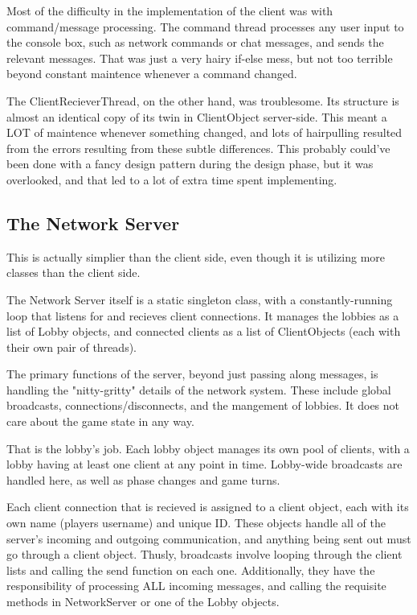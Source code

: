 \documentclass[12pt,a4paper]{article}
\begin{document}
Most of the difficulty in the implementation of the client was with command/message processing. The command thread processes any user input to the console box, such as network commands or chat messages, and sends the relevant messages. That was just a very hairy if-else mess, but not too terrible beyond constant maintence whenever a command changed.

The ClientRecieverThread, on the other hand, was troublesome. Its structure is almost an identical copy of its twin in ClientObject server-side. This meant a LOT of maintence whenever something changed, and lots of hairpulling resulted from the errors  resulting from these subtle differences. This probably could've been done with a fancy design pattern during the design phase, but it was overlooked, and that led to a lot of extra time spent implementing.

\subsection{The Network Server}

This is actually simplier than the client side, even though it is utilizing more classes than the client side. 

The Network Server itself is a static singleton class, with a constantly-running loop that listens for and recieves client connections. It manages the lobbies as a list of Lobby objects, and connected clients as a list of ClientObjects (each with their own pair of threads). 

The primary functions of the server, beyond just passing along messages, is handling the "nitty-gritty" details of the network system. 
These include global broadcasts, connections/disconnects, and the mangement of lobbies. It does not care about the game state in any way.

That is the lobby's job. Each lobby object manages its own pool of clients, with a lobby having at least one client at any point in time. 
Lobby-wide broadcasts are handled here, as well as phase changes and game turns. 

Each client connection that is recieved is assigned to a client object, each with its own name (players username) and unique ID. These objects handle all of the server's incoming and outgoing communication, and anything being sent out must go through a client object. Thusly, broadcasts involve looping through the client lists and calling the send function on each one.
Additionally, they have the responsibility of processing ALL incoming messages, and calling the requisite methods in NetworkServer or one of the Lobby objects.
\end{document}
